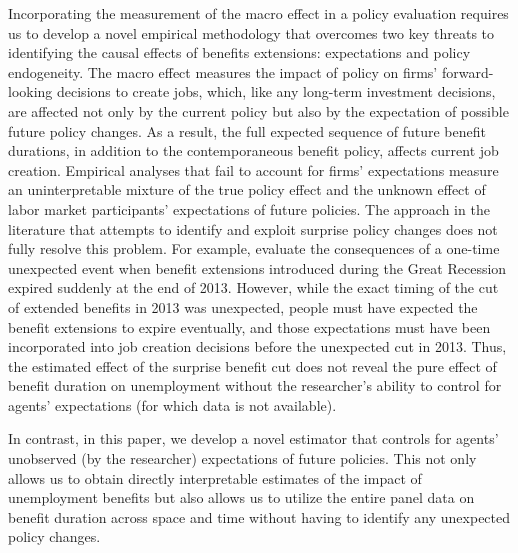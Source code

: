 \documentclass[12pt]{article}
\newcommand{\1}{\mathbf{1}}
\begin{document}
Incorporating the measurement of the macro effect in a policy evaluation requires us to develop a novel empirical methodology that overcomes two key threats to identifying the causal effects of benefits extensions: expectations and policy endogeneity. The macro effect measures the impact of policy on firms’ forward-looking decisions to create jobs, which, like any long-term investment decisions, are affected not only by the current policy but also by the expectation of possible future policy changes. As a result, the full expected sequence of future benefit durations, in addition to the contemporaneous benefit policy, affects current job creation.  Empirical analyses that fail to account for firms' expectations measure an uninterpretable mixture of the true policy effect and the unknown effect of labor market participants' expectations of future policies. The approach in the literature that attempts to identify and exploit surprise policy changes does not fully resolve this problem. For example, \citet{hagedorn+manovskii+mitman:15} evaluate the consequences of a one-time unexpected event when benefit extensions introduced during the Great Recession expired suddenly at the end of 2013. However, while the exact timing of the cut of extended benefits in 2013 was unexpected, people must have expected the benefit extensions to expire eventually, and those expectations must have been incorporated into job creation decisions before the unexpected cut in 2013. Thus, the estimated effect of the surprise benefit cut does not reveal the pure effect of benefit duration on unemployment without the researcher's ability to control for agents' expectations (for which data is not available). 

In contrast, in this paper, we develop a novel estimator that controls for agents' unobserved (by the researcher) expectations of future policies. This not only allows us to obtain directly interpretable estimates of the impact of unemployment benefits but also allows us to utilize the entire panel data on benefit duration across space and time without having to identify any unexpected policy changes.
\end{document}

